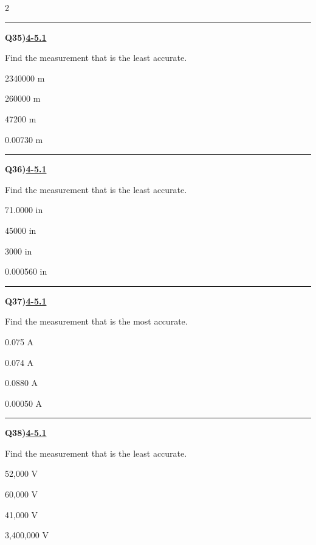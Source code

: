 \documentclass[11pt]{article}
\newenvironment{Qbox}[2]{%
  \par\medskip\noindent\begin{minipage}{\linewidth}%
  \hrule\medskip%
  \textbf{Q#1)}\hfill\textbf{\underline{#2}}\par\smallskip%
}{\par\end{minipage}\par\medskip}
\begin{document}
\begin{multicols}{2}
\begin{Qbox}{35}{4-5.1}
Find the measurement that is the least accurate.
\begin{choices}
  \item 2340000 m
  \item 260000 m
  \item 47200 m
  \item 0.00730 m
\end{choices}
\end{Qbox}

\begin{Qbox}{36}{4-5.1}
Find the measurement that is the least accurate.
\begin{choices}
  \item 71.0000 in
  \item 45000 in
  \item 3000 in
  \item 0.000560 in
\end{choices}
\end{Qbox}

\begin{Qbox}{37}{4-5.1}
Find the measurement that is the most accurate.
\begin{choices}
  \item 0.075 A
  \item 0.074 A
  \item 0.0880 A
  \item 0.00050 A
\end{choices}
\end{Qbox}

\begin{Qbox}{38}{4-5.1}
Find the measurement that is the least accurate.
\begin{choices}
  \item 52,000 V
  \item 60,000 V
  \item 41,000 V
  \item 3,400,000 V
\end{choices}
\end{Qbox}


\end{multicols}
\end{document}
